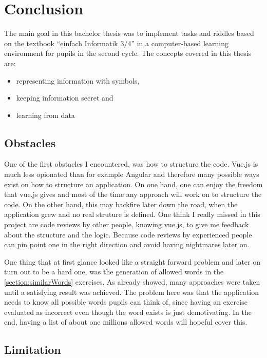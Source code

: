 \chapter{Conclusion}
\label{chapter:conclusion}

The main goal in this bachelor thesis was to implement tasks and riddles based on the textbook “einfach Informatik 3/4” in a computer-based learning environment for pupils in the second cycle. The concepts covered in this thesis are:

\begin{itemize}
    \item representing information with symbols,
    \item keeping information secret and
    \item learning from data
\end{itemize}

\section{Obstacles}
\label{section:obstacles}

One of the first obstacles I encountered, was how to structure the code. Vue.js is much less opionated than for example Angular and therefore many possible ways exist on how to structure an application. On one hand, one can enjoy the freedom that vue.js gives and most of the time any approach will work on to structure the code. On the other hand, this may backfire later down the road, when the application grew and no real struture is defined. One think I really missed in this project are code reviews by other people, knowing vue.js, to give me feedback about the structure and the logic. Because code reviews by experienced people can pin point one in the right direction and avoid having nightmares later on.

One thing that at first glance looked like a straight forward problem and later on turn out to be a hard one, was the generation of allowed words in the \ref{section:similarWords} exercises. As already showed, many approaches were taken until a satisfying result was achieved. The problem here was that the application needs to know all possible words pupils can think of, since having an exercise evaluated as incorrect even though the word exists is just demotivating. In the end, having a list of about one millions allowed words will hopeful cover this.

\section{Limitation}
\label{section:limitation}


